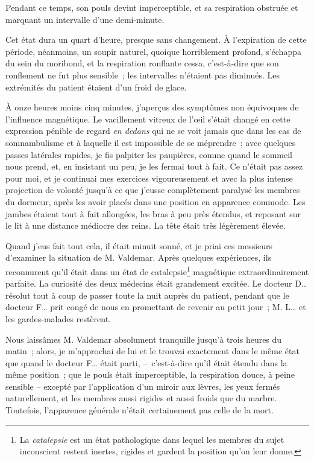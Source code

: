 \documentclass[french,twoside]{book} %
\begin{document}
Pendant ce temps, son pouls devint imperceptible, et sa respiration obstruée et marquant un intervalle d’une demi-minute.\par
Cet état dura un quart d’heure, presque sans changement. À l’expiration de cette période, néanmoins, un soupir naturel, quoique horriblement profond, s’échappa du sein du moribond, et la respiration ronflante cessa, c’est-à-dire que son ronflement ne fut plus sensible ; les intervalles n’étaient pas diminués. Les extrémités du patient étaient d’un froid de glace.\par
À onze heures moins cinq minutes, j’aperçus des symptômes non équivoques de l’influence magnétique. Le vacillement vitreux de l’œil s’était changé en cette expression pénible de regard \emph{en dedans} qui ne se voit jamais que dans les cas de somnambulisme et à laquelle il est impossible de se méprendre ; avec quelques passes latérales rapides, je fis palpiter les paupières, comme quand le sommeil nous prend, et, en insistant un peu, je les fermai tout à fait. Ce n’était pas assez pour moi, et je continuai mes exercices vigoureusement et avec la plus intense projection de volonté jusqu’à ce que j’eusse complètement paralysé les membres du dormeur, après les avoir placés dans une position en apparence commode. Les jambes étaient tout à fait allongées, les bras à peu près étendus, et reposant sur le lit à une distance médiocre des reins. La tête était très légèrement élevée.\par
Quand j’eus fait tout cela, il était minuit sonné, et je priai ces messieurs d’examiner la situation de M. Valdemar. Après quelques expériences, ils reconnurent qu’il était dans un état de catalepsie\footnote{La \emph{catalepsie} est un état pathologique dans lequel les membres du sujet inconscient restent inertes, rigides et gardent la position qu’on leur donne.} magnétique extraordinairement parfaite. La curiosité des deux médecins était grandement excitée. Le docteur D… résolut tout à coup de passer toute la nuit auprès du patient, pendant que le docteur F… prit congé de nous en promettant de revenir au petit jour ; M. L… et les gardes-malades restèrent.\par
Nous laissâmes M. Valdemar absolument tranquille jusqu’à trois heures du matin ; alors, je m’approchai de lui et le trouvai exactement dans le même état que quand le docteur F… était parti, – c’est-à-dire qu’il était étendu dans la même position ; que le pouls était imperceptible, la respiration douce, à peine sensible – excepté par l’application d’un miroir aux lèvres, les yeux fermés naturellement, et les membres aussi rigides et aussi froids que du marbre. Toutefois, l’apparence générale n’était certainement pas celle de la mort.\par
\end{document}
